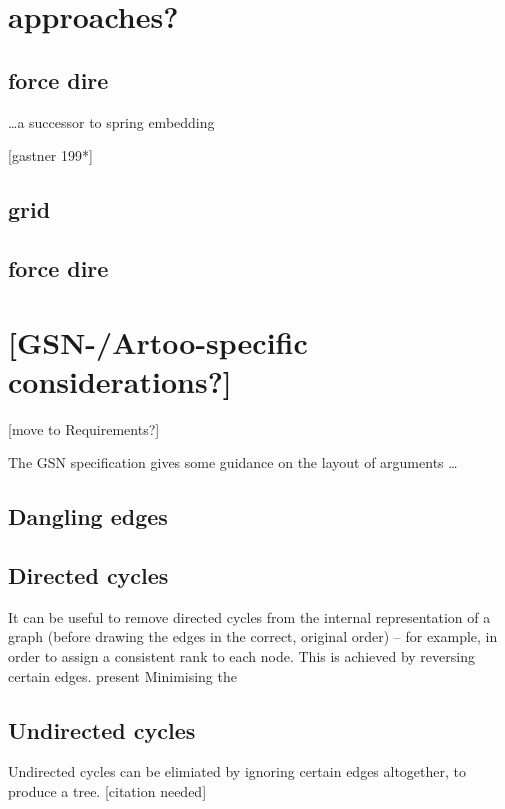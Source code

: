 \documentclass[authoryearcitations]{UoYCSproject}
\begin{document}
\section{approaches?}

\subsection{force dire}

\ldots a successor to \citet{tutte} spring embedding

[gastner 199*]

\subsection{grid}



\subsection{force dire}

\section{[GSN-/Artoo-specific considerations?]}

[move to Requirements?]

The GSN specification \citep[section~2.2, pp.~26--27]{gsnstandard} gives some guidance on the layout of arguments \ldots

\subsection{Dangling edges}


\subsection{Directed cycles}

It can be useful to remove directed cycles from the internal representation of a graph
(before drawing the edges in the correct, original order)
-- for example, in order to assign a consistent rank to each node.
This is achieved by reversing certain edges.
\citet{gansner1993} present  Minimising the 

\subsection{Undirected cycles}

Undirected cycles can be elimiated by ignoring certain edges altogether, to produce a tree.  [citation needed]
\end{document}
